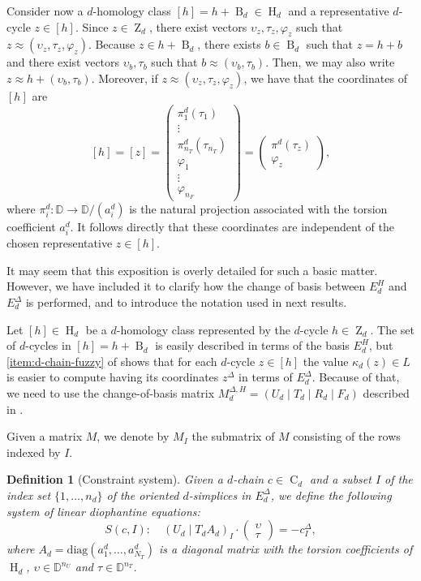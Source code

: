 \documentclass[a4paper,10pt]{article}
\newtheorem{definition}[theorem]{Definition}
\newcommand{\bbd}{\mathbb{D}}
\newcommand{\E}{E^\Delta}
\newcommand{\mdh}{M^{\Delta,H}}
\DeclareMathOperator{\Co}{C}
\DeclareMathOperator{\Zo}{Z}
\DeclareMathOperator{\Bo}{B}
\DeclareMathOperator{\Ho}{H}
\begin{document}
Consider now a \(d\)-homology class \([h] = h + \Bo_d \in \Ho_d\) and a representative \(d\)-cycle \(z \in [h]\). Since \(z \in \Zo_d\), there exist vectors \(\upsilon_z,\tau_z,\varphi_z\) such that \(z \approx (\upsilon_z,\tau_z,\varphi_z)\). Because \(z \in h +\Bo_d\), there exists \(b \in \Bo_d\) such that \(z = h+b\) and there exist vectors \(\upsilon_b,\tau_b\) such that \(b \approx (\upsilon_b, \tau_b)\). Then, we may also write \(z \approx h + (\upsilon_b, \tau_b)\). 
Moreover, if \(z \approx (\upsilon_z,\tau_z,\varphi_z)\), we have that the coordinates of \([h]\) are
\[
[h] = [z] =
\left(
\begin{array}{c}
\pi^{d}_{1}(\tau_1)\\
\vdots \\
\pi^{d}_{n_T}(\tau_{n_T}) \\
\varphi_1 \\
\vdots \\
\varphi_{n_F}
\end{array}
\right)
=
\left(
\begin{array}{c}
\pi^d(\tau_z)\\
\varphi_z
\end{array}
\right),
\]
where \(\pi^{d}_{i}: \bbd \to \bbd/(a^{d}_{i})\) is the natural projection associated with
the torsion coefficient \(a^{d}_{i}\). It follows directly that these coordinates are independent of the chosen representative \(z \in [h]\).

It may seem that this exposition is overly detailed for such a basic matter. However, we have included it to clarify how the change of basis between \(E^{H}_d\) and \(\E_d\) is performed, and to introduce the notation used in next results.

Let \([h] \in \Ho_d\) be a \(d\)-homology class represented by the \(d\)-cycle \(h \in \Zo_d\). The set of \(d\)-cycles in \([h] = h +\Bo_d\) is easily described in terms of the basis \(E^{H}_d\), but \cref{item:d-chain-fuzzy} of  shows that for each \(d\)-cycle \(z \in [h]\) the value \(\kappa_d(z) \in L\) is easier to compute having its coordinates \(z^{\Delta}\) in terms of \(\E_d\).
Because of that, we need to use the change-of-basis matrix \(\mdh_d = \left(U_d \mid T_d \mid R_d \mid F_d \right)\) described in .
 
Given a matrix \(M\), we denote by \(M_I\) the submatrix of \(M\) consisting of the rows indexed by \(I\).

\begin{definition}[Constraint system]
\label{def:constraint_system}
Given a \(d\)-chain \(c \in \Co_d\) and a subset 
\(I\) of the index set  \(\{1, \ldots, n_d\}\) of the oriented \(d\)-simplices in \(\E_d\), we define the following system of linear diophantine equations:
\[
S(c,I): \quad (U_{d} \mid T_{d} A_d)_I \cdot
\left(
\begin{array}{c}
\upsilon \\
\tau
\end{array}
\right)
= -c^{\Delta}_I,
\]
where \(A_d = \text{diag}(a^{d}_{1},\dots,a^{d}_{N_T})\) is  a diagonal matrix with the torsion coefficients of \(\Ho_d\), \(\upsilon \in \bbd^{n_U}\) and \(\tau \in \bbd^{n_T}\).
\end{definition}
\end{document}
